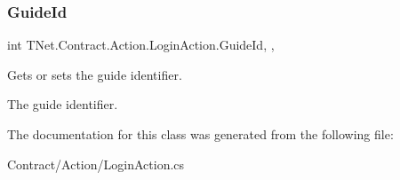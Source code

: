 \subsubsection{\texorpdfstring{Guide\+Id}{GuideId}}
{\footnotesize\ttfamily int T\+Net.\+Contract.\+Action.\+Login\+Action.\+Guide\+Id\hspace{0.3cm}{\ttfamily [get]}, {\ttfamily [set]}, {\ttfamily [protected]}}



Gets or sets the guide identifier. 

The guide identifier.

The documentation for this class was generated from the following file\+:\begin{DoxyCompactItemize}
\item 
Contract/\+Action/Login\+Action.\+cs\end{DoxyCompactItemize}
